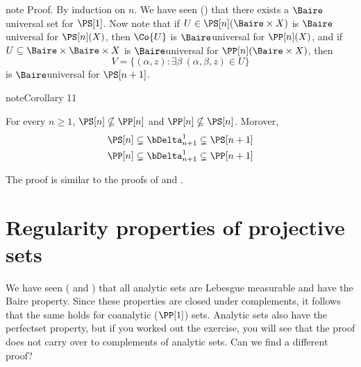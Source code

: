 \documentclass[letterpaper,10pt,english]{jupyterBook}
\begin{document}
\begin{sphinxadmonition}{note}
\sphinxAtStartPar
Proof. By induction on \(n\). We have seen ({\hyperref[\detokenize{imagesBorel:thm-Souslin-Borel-images}]{}}) that there exists a \(\Baire\)\sphinxhyphen{}universal set for \(\PS[1]\). Now note that if \(U \in \PS[n](\Baire\times X)\) is \(\Baire\)\sphinxhyphen{}universal for \(\PS[n](X)\), then \(\Co{U}\) is \(\Baire\)\sphinxhyphen{}universal for \(\PP[n](X)\), and if \(U \subseteq \Baire \times \Baire \times X\) is \(\Baire\)\sphinxhyphen{}universal for \(\PP[n](\Baire \times X)\), then
\begin{equation*}
	V = \{(\alpha,z) \colon \exists \beta \: (\alpha,\beta,z) \in U \}
\end{equation*}
\sphinxAtStartPar
is \(\Baire\)\sphinxhyphen{}universal for \(\PS[n+1]\).
\end{sphinxadmonition}
\label{projective:cor-projective-proper}
\begin{sphinxadmonition}{note}{Corollary 11}



\sphinxAtStartPar
For every \(n \geq 1\), \(\PS[n] \nsubseteq \PP[n]\) and \(\PP[n] \nsubseteq \PS[n]\). Morover,
\begin{gather*}
	\PS[n] \subsetneq \bDelta^1_{n+1} \subsetneq \PS[n+1] \\
	\PP[n] \subsetneq \bDelta^1_{n+1} \subsetneq \PP[n+1] \\		
\end{gather*}\end{sphinxadmonition}

\sphinxAtStartPar
The proof is similar to the proofs of {\hyperref[\detokenize{structureBorel:thm-Borel-proper}]{}} and {\hyperref[\detokenize{structureBorel:cor-hier-proper}]{}}.


\section{Regularity properties of projective sets}
\label{\detokenize{projective:regularity-properties-of-projective-sets}}
\sphinxAtStartPar
We have seen ({\hyperref[\detokenize{regularityAnalytic:cor-analytic-measurable}]{}} and {\hyperref[\detokenize{regularityAnalytic:prop-Souslin-Baire}]{}}) that all analytic sets are Lebesgue measurable and have the Baire property. Since these properties are closed under complements, it follows that the same holds for co\sphinxhyphen{}analytic (\(\PP[1]\)) sets. Analytic sets also have the perfect\sphinxhyphen{}set property, but if you worked out the exercise, you will see that the proof does not carry over to complements of analytic sets. Can we find a different proof?
\end{document}
